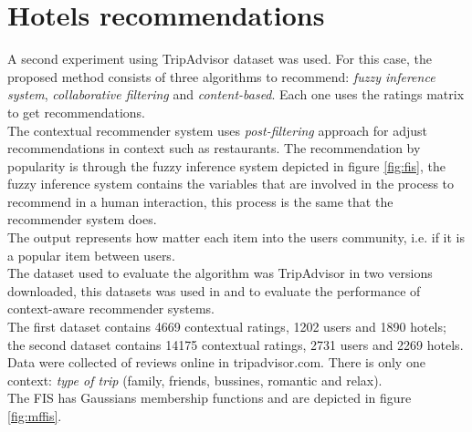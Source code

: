 \section{Hotels recommendations} \label{hotels}

A second experiment using TripAdvisor dataset was used. 
For this case, the proposed method consists of three algorithms 
to recommend:  \textit{fuzzy inference system}, \textit{collaborative 
filtering} and \textit{content-based}. Each one uses the ratings 
matrix to get recommendations.\\    
The contextual recommender system uses  \textit{post-filtering}
approach\cite{adomavicius2011context} for adjust recommendations in
context such as restaurants. The recommendation by popularity is 
through the fuzzy inference system depicted in figure \ref{fig:fis}, 
the fuzzy inference
system contains the variables that are involved in the process to
recommend in a human interaction, this process is the same that the
recommender system does. \\The output represents how matter each item
into the users community, i.e. if it is a popular item between users. \\
The dataset used to evaluate the algorithm was TripAdvisor in two
versions downloaded\cite{linkzeng}, this datasets was used in
\cite{zheng2014context} and \cite{zheng2012differential} to  evaluate the
performance of context-aware recommender systems. \\The first
dataset contains 4669 contextual ratings, 1202 users and 1890 hotels;
the second dataset contains 14175 contextual ratings, 2731 users and
2269 hotels. Data were collected of reviews online in tripadvisor.com.
There is only one context: \textit{type of trip} (family, friends, bussines,
romantic and relax).\\ 
The FIS has Gaussians membership functions and are depicted in figure
\ref{fig:mffis}.
